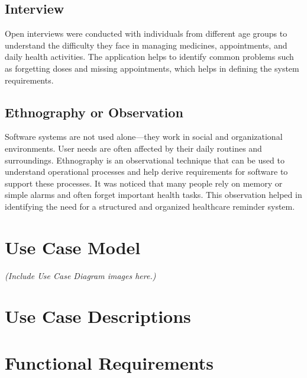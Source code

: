 \subsection{Interview}
Open interviews were conducted with individuals from different age groups to understand the difficulty they face in managing medicines, appointments, and daily health activities. The application helps to identify common problems such as forgetting doses and missing appointments, which helps in defining the system requirements.

\subsection{Ethnography or Observation}
Software systems are not used alone---they work in social and organizational environments. User needs are often affected by their daily routines and surroundings. Ethnography is an observational technique that can be used to understand operational processes and help derive requirements for software to support these processes. It was noticed that many people rely on memory or simple alarms and often forget important health tasks. This observation helped in identifying the need for a structured and organized healthcare reminder system.

\section{Use Case Model}
\label{sec:use-case-model}


\textit{(Include Use Case Diagram images here.)}

\section{Use Case Descriptions}
\label{sec:use-case-desc}



\section{Functional Requirements}
\label{sec:functional-req}

